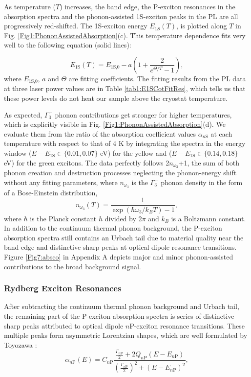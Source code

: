 \documentclass[aps,reprint,amsmath,amssymb,prb]{revtex4-1}
\begin{document}
As temperature ($T$) increases, the band edge, the P-exciton resonances in the absorption spectra and the phonon-assisted 1S-exciton peaks in the PL are all progressively red-shifted. The 1S-exciton energy $E_{1S}(T)$, is plotted along $T$ in Fig. \ref{Fig1:PhononAssistedAbsorption}(c). This temperature dependence fits very well to the following equation (solid lines):

\begin{equation}\label{eq:Tdep}
E_\text{1S}(T) = E_\text{1S,0}- a \left(1+\frac{2}{e^{\Theta/T}-1}\right),
\end{equation}
where $E_\text{1S,0}$, $a$ and $\Theta$ are fitting coefficients. The fitting results from the PL data at three laser power values are in Table \ref{tab1:E1SCotFitRes}, which tells us that these power levels do not heat our sample above the cryostat temperature. 

As expected, $\Gamma_3^-$ phonon contributions get stronger for higher temperatures, which is explicitly visible in Fig. \ref{Fig1:PhononAssistedAbsorption}(d). We evaluate them from the ratio of the absorption coefficient values $\alpha_{n\text{S}}$ at each temperature with respect to that of 4 K by integrating the spectra in the energy window ($E-E_\text{1S} \in \{0.01, 0.07\}$ eV) for the yellow and  ($E-E_\text{1S} \in \{0.14, 0.18\}$ eV) for the green excitons. The data perfectly follows 2$n_{\omega_3}$+1, the sum of both phonon creation and destruction processes neglecting the phonon-energy shift without any fitting parameters, where $n_{\omega_3}$ is the $\Gamma_3^-$ phonon density in the form of a Bose-Einstein distribution,
\begin{equation*}
n_{\omega_3}(T)=\frac{1}{\exp \left(\hbar \omega_3 / k_B T\right)-1}, \end{equation*}
where $\hbar$ is the Planck constant $h$ divided by 2$\pi$ and $k_B$ is a Boltzmann constant.
In addition to the continuum thermal phonon background, the P-exciton absorption spectra still contains an Urbach tail due to material quality near the band edge and distinctive sharp peaks at optical dipole resonance transitions. Figure \ref{Fig7:absco} in Appendix A depicts major and minor phonon-assisted contributions to the broad background signal.

\subsubsection{Rydberg Exciton Resonances}

After subtracting the continuum thermal phonon background and Urbach tail, the remaining part of the P-exciton absorption spectra is series of distinctive sharp peaks attributed to optical dipole $n$P-exciton resonance transitions. These multiple peaks form asymmetric Lorentzian shapes, which are well formulated by Toyozawa \cite{Toyozawa1958}:
\begin{equation}\label{eq:toyozawa}
\alpha_{n\text{P}}(E) = C_{n\text{P}} \frac{\frac{\Gamma_{n\text{P}}}{2}+2 Q_{n\text{P}}\left(E-E_{n\text{P}}\right)}{\left(\frac{\Gamma_{n\text{P}}}{2}\right)^{2}+\left(E-E_{n\text{P}}\right)^{2}},
\end{equation}
\end{document}
